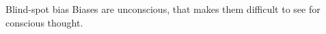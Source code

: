 \documentclass{beamer}
\begin{document}
\begin{frame}
  \begin{block}{Blind-spot bias}
    Biases are unconscious, that makes them difficult to see for conscious 
    thought.
  \end{block}
\end{frame}

%
%
%
%
%
\end{document}
